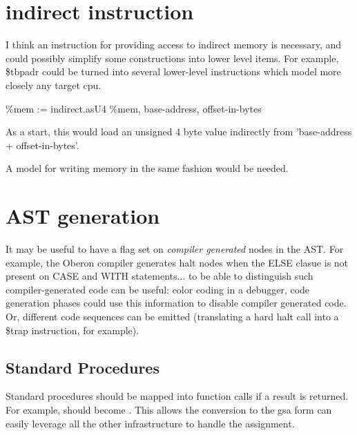 \section{indirect instruction}

I think an instruction for providing access to indirect memory is
necessary, and could possibly simplify some constructions into lower
level items.  For example, \$tbpadr could be turned into several
lower-level instructions which model more closely any target cpu.

\%mem := indirect.asU4  \%mem, base-address, offset-in-bytes

As a start, this would load an unsigned 4 byte value indirectly from
'base-address + offset-in-bytes'.

A model for writing memory in the same fashion would be needed.

\section{AST generation}

It may be useful to have a flag set on \emph{compiler generated} nodes
in the AST.  For example, the Oberon compiler generates halt
nodes when the ELSE clasue is not present on CASE and WITH
statements... to be able to distinguish such compiler-generated code
can be useful: color coding in a debugger, code generation phases
could use this information to disable compiler generated code.  Or,
different code sequences can be emitted (translating a hard halt call
into a \$trap instruction, for example).

\subsection{Standard Procedures}
Standard procedures should be mapped into function calls if a result
is returned.  For example,  should become .  This allows the conversion to the
\ac{gsa} form can easily leverage all the other infrastructure to
handle the assignment.


